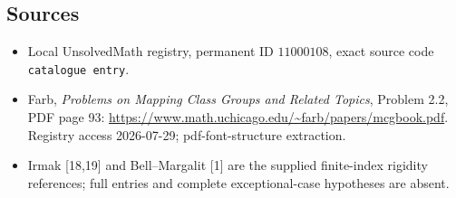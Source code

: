 \documentclass[11pt]{article}
\begin{document}
\subsection{Sources}
\begin{itemize}
\item Local UnsolvedMath registry, permanent ID \(11000108\), exact source code \texttt{catalogue entry}.
\item Farb, \emph{Problems on Mapping Class Groups and Related Topics}, Problem 2.2, PDF page 93: \url{https://www.math.uchicago.edu/~farb/papers/mcgbook.pdf}. Registry access 2026-07-29; pdf-font-structure extraction.
\item Irmak [18,19] and Bell--Margalit [1] are the supplied finite-index rigidity references; full entries and complete exceptional-case hypotheses are absent.
\end{itemize}
\end{document}
